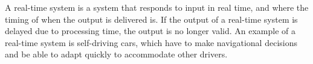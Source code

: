 A real-time system is a system that responds to input in real time, and where the timing of when the output is delivered is\cite{realtime2006}.
If the output of a real-time system is delayed due to processing time, the output is no longer valid.
An example of a real-time system is self-driving cars, which have to make navigational decisions and be able to adapt quickly to accommodate other drivers. 
